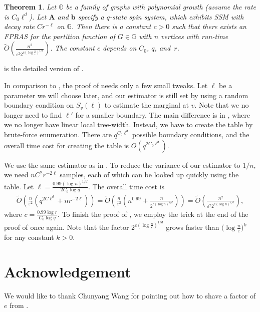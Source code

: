 \documentclass[10pt,a4paper]{article}
\newtheorem{theorem}{Theorem}[section]
\def\=#1{\mathbb{#1}}
\newcommand{\eps}{\varepsilon}
\begin{document}
\begin{theorem} \label{thm:polylog}
  Let $\=G$ be a family of graphs with polynomial growth (assume the rate is $C_0\ell^d$).
  Let ${\mathbf{A}}$ and ${\mathbf{b}}$ specify a $q$-state spin system, which exhibits SSM with decay rate $Cr^{-\ell}$ on $\=G$.
  Then there is a constant $c>0$ such that there exists an FPRAS for the partition function of $G\in\=G$ with $n$ vertices with run-time $\widetilde{O}\left(\frac{n^2}{\eps^2 2^{c(\log \frac{n}{\eps})^{1/d}}}\right)$.
  The constant $c$ depends on $C_0$, $q$, and~$r$.
\end{theorem}

 is the detailed version of .

In comparison to ,
the proof of  needs only a few small tweaks.
Let $\ell$ be a parameter we will choose later,
and our estimator is still set by using a random boundary condition on $S_v(\ell)$ to estimate the marginal at $v$.
Note that we no longer need to find $\ell'$ for a smaller boundary.
The main difference is in ,
where we no longer have linear local tree-width.
Instead, we have to create the table by brute-force enumeration.
There are $q^{C_0\ell^d}$ possible boundary conditions,
and the overall time cost for creating the table is $O(q^{2C_0\ell^d})$.

We use the same estimator as in .
To reduce the variance of our estimator to $1/n$, we need $nC^2r^{-2\ell}$ samples,
each of which can be looked up quickly using the table.
Let $\ell=\frac{0.99(\log n)^{1/d}}{2C_0\log q}$.
The overall time cost is
\begin{align*}
  \widetilde{O}\left( \frac{n}{\eps^2}\left( q^{2C\ell^d}+ nr^{-2\ell}\right) \right)
  =\widetilde{O}\left( \frac{n}{\eps^2}\left(n^{0.99}+\frac{n}{2^{c(\log n)^{1/d}}}\right) \right)
  =\widetilde{O}\left(\frac{n^2}{\eps^2 2^{c(\log n)^{1/d}}}\right),
\end{align*}
where $c=\frac{0.99\log r}{C_0\log q}$.
To finish the proof of ,
we employ the trick at the end of the proof of  once again.
Note that the factor $2^{c(\log \frac{n}{\eps})^{1/d}}$ grows faster than $\big(\log \frac{n}{\eps}\big)^k$ for any constant $k>0$.

\section*{Acknowledgement}
We would like to thank Chunyang Wang for pointing out how to shave a factor of $e$ from . 
\end{document}
